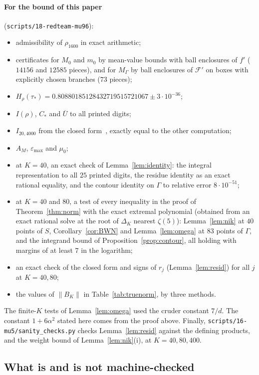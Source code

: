 \documentclass[11pt]{article}
\theoremstyle{remark}
\newcommand{\Ubar}{\overline{U}}
\newcommand{\epsmax}{\varepsilon_{\max}}
\newcommand{\file}[1]{\texttt{#1}}
\newcommand{\Cstar}{C_{*}}
\begin{document}
\paragraph{For the bound of this paper} (\file{scripts/18-redteam-mu96}):
\begin{itemize}
\item admissibility of $\rho_{1600}$ in exact arithmetic;
\item certificates for $M_0$ and $m_0$ by mean-value bounds with ball enclosures of $f'$ ($14156$ and $12585$ pieces), and for $M_\Gamma$ by ball enclosures of $\mathcal F'$ on boxes with explicitly chosen branches ($73$ pieces);
\item $H_\rho(\tau_*)=0.80880185128432719515721067\pm3\cdot10^{-36}$;
\item $I(\rho)$, $\Cstar$ and $\Ubar$ to all printed digits;
\item $I_{20,4000}$ from the closed form~\cite[(5.12)--(5.13), (B.1)]{F}, exactly equal to the other computation;
\item $A_M$, $\epsmax$ and $\mu_0$;
\item at $K=40$, an exact check of Lemma~\ref{lem:identity}: the integral representation to all $25$ printed digits, the residue identity as an exact rational equality, and the contour identity on $\Gamma$ to relative error $8\cdot10^{-51}$;
\item at $K=40$ and $80$, a test of every inequality in the proof of Theorem~\ref{thm:norm} with the exact extremal polynomial (obtained from an exact rational solve at the root of $\Delta_K$ nearest $\zeta(5)$): Lemma~\ref{lem:nik} at $40$ points of $S$, Corollary~\ref{cor:BWN} and Lemma~\ref{lem:omega} at $83$ points of $\Gamma$, and the integrand bound of Proposition~\ref{prop:contour}, all holding with margins of at least $7$ in the logarithm;
\item an exact check of the closed form and signs of $r_j$ (Lemma~\ref{lem:resid}) for all $j$ at $K=40,80$;
\item the values of $\|B_K\|$ in Table~\ref{tab:truenorm}, by three methods.
\end{itemize}
The finite-$K$ tests of Lemma~\ref{lem:omega} used the cruder constant $7/d$. The constant $1+6\alpha^2$ stated here comes from the proof above. Finally, \file{scripts/16-mu5/sanity\_checks.py} checks Lemma~\ref{lem:resid} against the defining products, and the weight bound of Lemma~\ref{lem:nik}(i), at $K=40,80,400$.

\subsection{What is and is not machine-checked}
\end{document}
